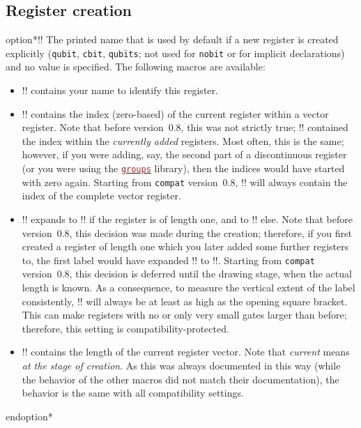\documentclass{scrartcl}
\def\unskipOpt{\vskip-5mm }
\newenvironment{option}[1][]{\csname option*\endcsname[{#1}]{yquant}}{\csname endoption*\endcsname}
\def\pkg#1{\textcolor{brown}{\texttt{#1}}}
\def\langlink#1{\hyperref[sec:foreign:#1]{\pkg{#1}}}
\def\ttlink{\link\texttt}
\begin{document}
      \subsection{Register creation}\unskipOpt
         \begin{option}{register/default name}!\regidx!
            The printed name that is used by default if a new register is created explicitly (\ttlink{qubit}, \ttlink{cbit}, \ttlink{qubits}; not used for \ttlink{nobit} or for implicit declarations) and no value is specified.
            The following macros are available:
            \begin{itemize}
               \item \linkdef\reg\tex!\reg! contains your name to identify this register.
               \item \linkdef\idx\tex!\idx! contains the index (zero\hyp based) of the current register within a vector register.
                  Note that before version~0.8, this was not strictly true; \tex!\idx! contained the index within the \emph{currently added} registers.
                  Most often, this is the same; however, if you were adding, say, the second part of a discontinuous register (or you were using the \langlink{groups} library), then the indices would have started with zero again.
                  Starting from \ttlink{compat} version~0.8, \tex!\idx! will always contain the index of the complete vector register.
               \item \linkdef\regidx\tex!\regidx! expands to \tex!\reg! if the register is of length one, and to \tex!\reg[\idx]! else.
                  Note that before version~0.8, this decision was made during the creation; therefore, if you first created a register of length one which you later added some further registers to, the first label would have expanded \tex!\regidx! to \tex!\reg!.
                  Starting from \ttlink{compat} version~0.8, this decision is deferred until the drawing stage, when the actual length is known.
                  As a consequence, to measure the vertical extent of the label consistently, \tex!\regidx! will always be at least as high as the opening square bracket.
                  This can make registers with no or only very small gates larger than before; therefore, this setting is compatibility\hyp protected.
               \item \linkdef\len\tex!\len! contains the length of the current register vector.
                  Note that \emph{current} means \emph{at the stage of creation}.
                  As this was always documented in this way (while the behavior of the other macros did not match their documentation), the behavior is the same with all compatibility settings.
            \end{itemize}
         \end{option}
\end{document}
